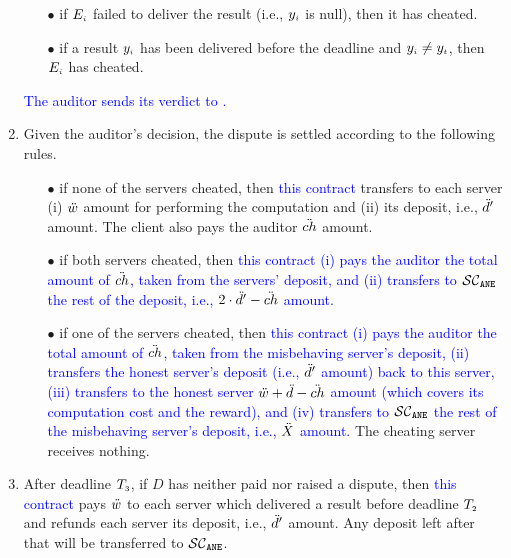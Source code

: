 \begin{enumerate}
%
\begin{itemize}
%
\item[$\bullet$] if $E_{\scriptscriptstyle i}$ failed to deliver the result (i.e., $y_{\scriptscriptstyle i}$ is null), then it has cheated. 
%
\item[$\bullet$] if a result $y_{\scriptscriptstyle i}$ has been delivered before the deadline and $y_{\scriptscriptstyle i}\neq y_{\scriptscriptstyle t}$, then $E_{\scriptscriptstyle i}$ has cheated. 
%
\end{itemize}
%
\textcolor{blue}{The auditor sends its verdict to \SCpc.} 
%
\item Given the auditor's decision, the dispute is settled according to the following rules.
%
\begin{itemize}
%
\item[$\bullet$] if none of the servers cheated, then \textcolor{blue}{this contract} transfers to each server (i) $\ddot{w}$ amount for performing the computation and (ii) its deposit, i.e., $\ddot{d}'$ amount. The client also pays the auditor $\ddot{ch}$ amount.  
%
\item[$\bullet$] if both servers cheated, then \textcolor{blue}{this contract (i) pays the auditor the total amount of $\ddot{ch}$, taken from the servers' deposit, and (ii) transfers to  $\mathcal{SC}_{\mathtt{ANE}}$ the rest of the deposit, i.e., $2\cdot \ddot{d}'-\ddot{ch}$ amount.} 
%
\item[$\bullet$] if one of the servers cheated, then \textcolor{blue}{this contract (i) pays the auditor the total amount of $\ddot{ch}$, taken from the misbehaving server's deposit, (ii) transfers the honest server's deposit (i.e., $\ddot{d}'$ amount) back to this server,  (iii) transfers to the honest server $\ddot{w}+\ddot{d}-\ddot{ch}$ amount (which covers its computation cost and the reward), and  (iv) transfers to $\mathcal{SC}_{\mathtt{ANE}}$ the rest of the misbehaving server's deposit, i.e., $\ddot{X}$ amount.} The cheating server receives nothing.  
%
\end{itemize} 
%
\item After deadline $T_{\scriptscriptstyle 3}$, if $ { D}$ has neither paid nor raised a dispute, then \textcolor{blue}{this contract} pays $\ddot{w}$ to each server which delivered a result before deadline $T_{\scriptscriptstyle 2}$ and refunds each server its deposit, i.e., $\ddot{d}'$ amount. Any deposit left after that will be transferred to \textcolor{blue}{$\mathcal{SC}_{\mathtt{ANE}}$}. 
%
\end{enumerate}


